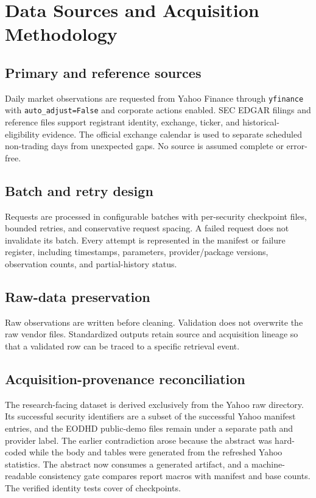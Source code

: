\section{Data Sources and Acquisition Methodology}

\subsection{Primary and reference sources}

Daily market observations are requested from Yahoo Finance through
\texttt{yfinance} \citep{yfinance,yahoofinance} with
\texttt{auto\_adjust}\allowbreak\texttt{=False} and corporate actions
enabled. SEC EDGAR filings and reference files support registrant identity,
exchange, ticker, and historical-eligibility evidence. The official exchange
calendar is used to separate scheduled non-trading days from unexpected gaps.
No source is assumed complete or error-free.

\subsection{Batch and retry design}

Requests are processed in configurable batches with per-security checkpoint
files, bounded retries, and conservative request spacing. A failed request does
not invalidate its batch. Every attempt is represented in the manifest or
failure register, including timestamps, parameters, provider/package versions,
observation counts, and partial-history status.

\subsection{Raw-data preservation}

Raw observations are written before cleaning. Validation does not overwrite the
raw vendor files. Standardized outputs retain source and acquisition lineage so
that a validated row can be traced to a specific retrieval event.


\subsection{Acquisition-provenance reconciliation}

The research-facing dataset is derived exclusively from the Yahoo raw
directory. Its successful security identifiers are a subset of the successful
Yahoo manifest entries, and the EODHD public-demo files remain under a separate
path and provider label. The earlier contradiction arose because the abstract
was hard-coded while the body and tables were generated from the refreshed
Yahoo statistics. The abstract now consumes a generated artifact, and a
machine-readable consistency gate compares report macros with manifest and
base counts. The verified identity tests cover \IdentityValid{} of
\YahooSuccess{} checkpoints.

